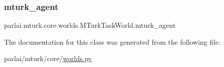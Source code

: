 \subsubsection{\texorpdfstring{mturk\+\_\+agent}{mturk\_agent}}
{\footnotesize\ttfamily parlai.\+mturk.\+core.\+worlds.\+M\+Turk\+Task\+World.\+mturk\+\_\+agent}



The documentation for this class was generated from the following file\+:\begin{DoxyCompactItemize}
\item 
parlai/mturk/core/\hyperlink{parlai_2mturk_2core_2worlds_8py}{worlds.\+py}\end{DoxyCompactItemize}
